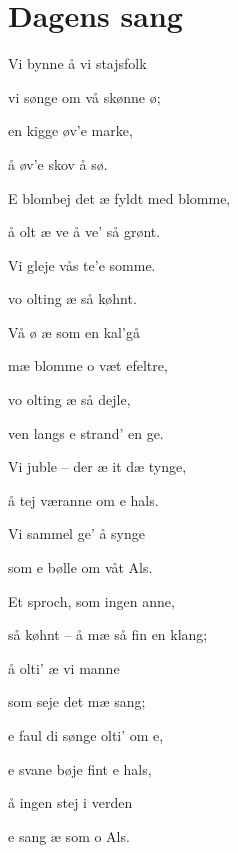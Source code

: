 \begin{minipage}[t]{100mm}
\vspace{3mm}

\section*{Dagens sang}
\begin{center}
Vi bynne å vi stajsfolk

vi sønge om vå skønne ø;

en kigge øv’e marke,

å øv’e skov å sø.

E blombej det æ fyldt med blomme,

å olt æ ve å ve’ så grønt.

Vi gleje vås te’e somme.

vo olting æ så køhnt.

Vå ø æ som en kal’gå

mæ blomme o væt efeltre,

vo olting æ så dejle,

ven langs e strand’ en ge.

Vi juble – der æ it dæ tynge,

å tej væranne om e hals.

Vi sammel ge’ å synge

som e bølle om våt Als.

Et sproch, som ingen anne,

så køhnt – å mæ så fin en klang;

å olti’ æ vi manne

som seje det mæ sang;

e faul di sønge olti’ om e,

e svane bøje fint e hals,

å ingen stej i verden

e sang æ som o Als.
\end{center}


\end{minipage}
